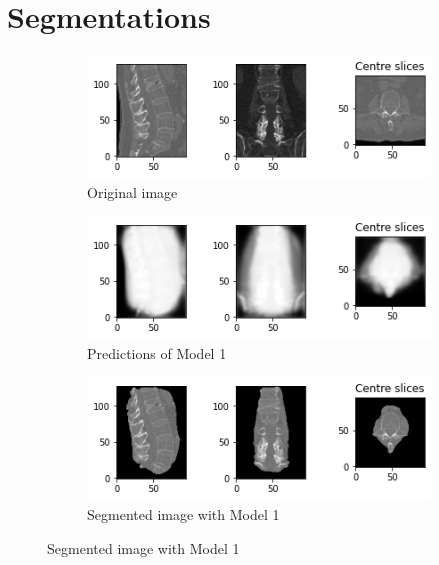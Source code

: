 \chapter{Segmentations}

\begin{figure}[ht!]
\centering
\begin{subfigure}[b]{0.7\textwidth}
   \includegraphics[width=1\linewidth]{images/results_2/original.png}
   \caption{Original image}
   \label{fig:Ng1} 
\end{subfigure}

\begin{subfigure}[b]{0.7\textwidth}
   \includegraphics[width=1\linewidth]{images/results_2/binary_mask.png}
   \caption{Predictions of Model 1}
   \label{fig:Ng2}
\end{subfigure}

\begin{subfigure}[b]{0.7\textwidth}
   \includegraphics[width=1\linewidth]{images/results_2/binary_segmented.png}
   \caption{Segmented image with Model 1}
   \label{fig:Ng3}
\end{subfigure}


\end{figure}
